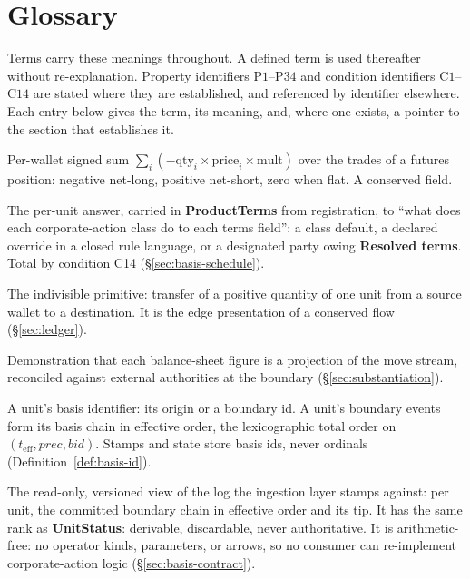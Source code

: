 \section{Glossary}
\label{app:glossary}

Terms carry these meanings throughout. A defined term is used thereafter without
re-explanation. Property identifiers $\mathrm{P}1$--$\mathrm{P}34$ and condition
identifiers $\mathrm{C}1$--$\mathrm{C}14$ are stated where they are established,
and referenced by identifier elsewhere. Each entry below gives the term, its meaning,
and, where one exists, a pointer to the section that establishes it.

\begin{description}[style=nextline]

\item[Accumulated cost] Per-wallet signed sum $\sum_i(-\mathrm{qty}_i\times\mathrm{price}_i\times\mathrm{mult})$ over the trades of a futures position: negative net-long, positive net-short, zero when flat. A conserved field.

\item[Adjustment schedule] The per-unit answer, carried in \textbf{ProductTerms} from registration, to ``what does each corporate-action class do to each terms field'': a class default, a declared override in a closed rule language, or a designated party owing \textbf{Resolved terms}. Total by condition C14 (\S\ref{sec:basis-schedule}).

\item[Atomic move] The indivisible primitive: transfer of a positive quantity of one unit from a source wallet to a destination. It is the edge presentation of a conserved flow (\S\ref{sec:ledger}).

\item[Balance-sheet substantiation] Demonstration that each balance-sheet figure is a projection of the move stream, reconciled against external authorities at the boundary (\S\ref{sec:substantiation}).

\item[Basis id (\texttt{BasisId})] A unit's basis identifier: its origin or a boundary id. A unit's boundary events form its basis chain in effective order, the lexicographic total order on $(t_{\mathrm{eff}},\mathit{prec},\mathit{bid})$. Stamps and state store basis ids, never ordinals (Definition~\ref{def:basis-id}).

\item[Basis projection (\texttt{BasisView})] The read-only, versioned view of the log the ingestion layer stamps against: per unit, the committed boundary chain in effective order and its tip. It has the same rank as \textbf{UnitStatus}: derivable, discardable, never authoritative. It is arithmetic-free: no operator kinds, parameters, or arrows, so no consumer can re-implement corporate-action logic (\S\ref{sec:basis-contract}).


\end{description}
